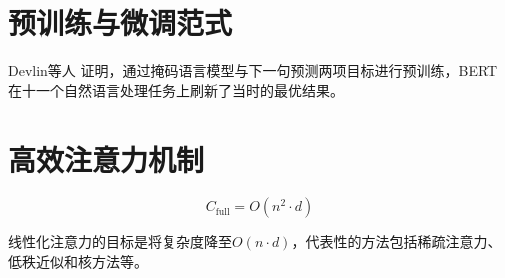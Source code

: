 \section{预训练与微调范式}

\zhlipsum[7]

Devlin等人\cite{devlin2019bert} 证明，通过掩码语言模型与下一句预测两项目标进行预训练，BERT 在十一个自然语言处理任务上刷新了当时的最优结果。

\section{高效注意力机制}

\zhlipsum[9]

\begin{equation}
  C_{\text{full}} = O(n^2 \cdot d)
  \label{eq:complexity_full}
\end{equation}

线性化注意力的目标是将复杂度降至$O(n \cdot d)$，代表性的方法包括稀疏注意力、低秩近似和核方法等\cite{vaswani2017attention}。
